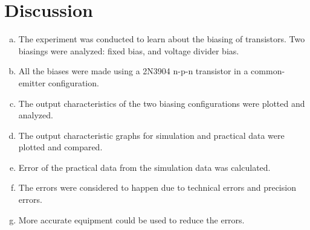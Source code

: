 \documentclass[12pt]{article}
\begin{document}
\newpage
\section{Discussion}
\begin{enumerate}[(a)]
    \item The experiment was conducted to learn about the biasing of transistors. Two biasings were analyzed: fixed bias, and voltage divider bias.
    \item All the biases were made using a 2N3904 n-p-n transistor in a common-emitter configuration.
    \item The output characteristics of the two biasing configurations were plotted and analyzed.
    \item The output characteristic graphs for simulation and practical data were plotted and compared.
    \item Error of the practical data from the simulation data was calculated.
    \item The errors were considered to happen due to technical errors and precision errors.
    \item More accurate equipment could be used to reduce the errors.
\end{enumerate}
\end{document}
